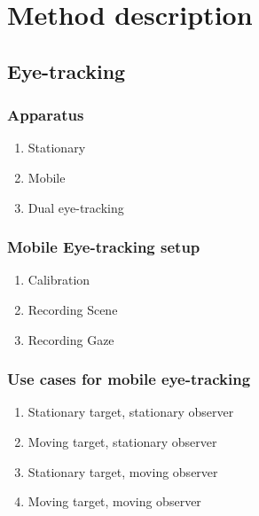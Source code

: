 \documentclass{sig-alternate}
\begin{document}

\section{Method description}

\subsection{Eye-tracking}


\subsubsection{Apparatus}
\begin{enumerate}
\item Stationary
\item Mobile 
\item Dual eye-tracking

\end {enumerate}


\subsubsection{Mobile Eye-tracking setup}

\begin{enumerate}
\item Calibration
\item Recording Scene 
\item Recording Gaze

\end {enumerate}

\subsubsection{Use cases for mobile eye-tracking} 

\begin{enumerate}
\item Stationary target, stationary observer
\item Moving target, stationary observer
\item Stationary target, moving observer
\item Moving target, moving observer
\end{enumerate}
\end{document}
